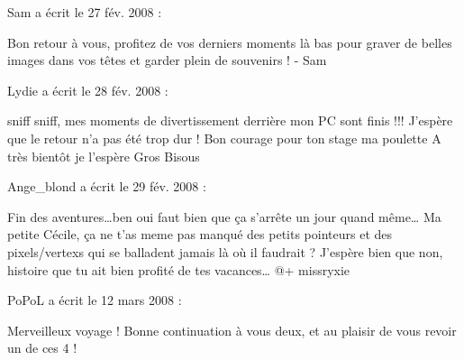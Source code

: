\medskip
Sam a écrit le 27 fév. 2008 :
\begin{displayquote}
Bon retour à vous, profitez de vos derniers moments là bas pour graver de belles images dans vos têtes et garder plein de souvenirs !
- Sam
\end{displayquote}

\medskip
Lydie a écrit le 28 fév. 2008 :
\begin{displayquote}
sniff sniff, mes moments de divertissement derrière mon PC sont finis !!!
J'espère que le retour n'a pas été trop dur !
Bon courage pour ton stage ma poulette
A très bientôt je l'espère
Gros Bisous
\end{displayquote}

\medskip
Ange\_blond a écrit le 29 fév. 2008 :
\begin{displayquote}
Fin des aventures\dots ben oui faut bien que ça s'arrête un jour quand même\dots
Ma petite Cécile, ça ne t'as meme pas manqué des petits pointeurs et des pixels/vertexs qui se balladent jamais là où il faudrait ?
J'espère bien que non, histoire que tu ait bien profité de tes vacances\dots
@+ missryxie
\end{displayquote}

\medskip
PoPoL a écrit le 12 mars 2008 :
\begin{displayquote}
Merveilleux voyage ! Bonne continuation à vous deux, et au plaisir de vous revoir un de ces 4 !
\end{displayquote}
